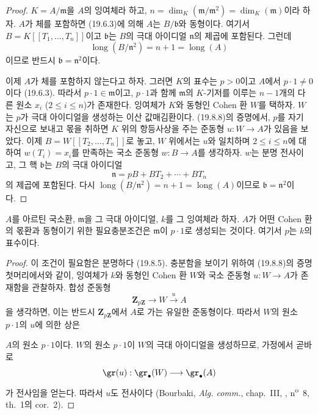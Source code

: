 \begin{proof}
$K=A/\mathfrak m$을 $A$의 잉여체라 하고,
$n=\dim_K(\mathfrak m/\mathfrak m^2)=\dim_K(\mathfrak m)$이라 하자.
$A$가 체를 포함하면 (19.6.3)에 의해 $A$는 $B/\mathfrak b$와 동형이다.
여기서 $B=K[[T_1,\ldots,T_n]]$이고 $\mathfrak b$는 $B$의 극대
아이디얼 $\mathfrak n$의 제곱에 포함된다. 그런데
\[
  \operatorname{long}(B/\mathfrak n^2)=n+1
  =\operatorname{long}(A)
\]
이므로 반드시 $\mathfrak b=\mathfrak n^2$이다.

이제 $A$가 체를 포함하지 않는다고 하자. 그러면 $K$의 표수는
$p>0$이고 $A$에서 $p\cdot1\neq0$이다 (19.6.3). 따라서
$p\cdot1\in\mathfrak m$이고, $p\cdot1$과 함께 $\mathfrak m$의
$K$-기저를 이루는 $n-1$개의 다른 원소
$x_i$ ($2\leq i\leq n$)가 존재한다. 잉여체가 $K$와 동형인 Cohen 환
$W$를 택하자. $W$는 $p$가 극대 아이디얼을 생성하는 이산 값매김환이다.
(19.8.8)의 증명에서, $p$를 자기 자신으로 보내고 몫을 취하면 $K$ 위의
항등사상을 주는 준동형 $u:W\to A$가 있음을 보았다. 이제
$B=W[[T_2,\ldots,T_n]]$로 놓고, $W$ 위에서는 $u$와 일치하며
$2\leq i\leq n$에 대하여 $w(T_i)=x_i$를 만족하는 국소 준동형
$w:B\to A$를 생각하자. $w$는 분명 전사이고, 그 핵 $\mathfrak b$는
$B$의 극대 아이디얼
\[
  \mathfrak n=pB+BT_2+\cdots+BT_n
\]
의 제곱에 포함된다. 다시
$\operatorname{long}(B/\mathfrak n^2)=n+1=\operatorname{long}(A)$이므로
$\mathfrak b=\mathfrak n^2$이다.
\end{proof}

\begin{proposition}[19.8.11]
\label{0.19.8.11-ko}
$A$를 아르틴 국소환, $\mathfrak m$을 그 극대 아이디얼, $k$를 그
잉여체라 하자. $A$가 어떤 Cohen 환의 몫환과 동형이기 위한 필요충분조건은
$\mathfrak m$이 $p\cdot1$로 생성되는 것이다. 여기서 $p$는 $k$의
표수이다.
\end{proposition}

\begin{proof}
이 조건이 필요함은 분명하다 (19.8.5). 충분함을 보이기 위하여
(19.8.8)의 증명 첫머리에서와 같이, 잉여체가 $k$와 동형인 Cohen 환
$W$와 국소 준동형 $u:W\to A$가 존재함을 관찰하자. 합성 준동형
\[
  \mathbf Z_{p\mathbf Z}\longrightarrow W\xrightarrow{u}A
\]
을 생각하면, 이는 반드시 $\mathbf Z_{p\mathbf Z}$에서 $A$로 가는
유일한 준동형이다. 따라서 $W$의 원소 $p\cdot1$의 $u$에 의한 상은


$A$의 원소 $p\cdot1$이다. $W$의 원소 $p\cdot1$이 $W$의 극대
아이디얼을 생성하므로, 가정에서 곧바로
\[
  \gr(u):\gr_\bullet(W)\longrightarrow\gr_\bullet(A)
\]
가 전사임을 얻는다. 따라서 $u$도 전사이다 (Bourbaki,
\emph{Alg. comm.}, chap.~III, ,
n\textsuperscript{o}~8, th.~1의 cor.~2).
\end{proof}

